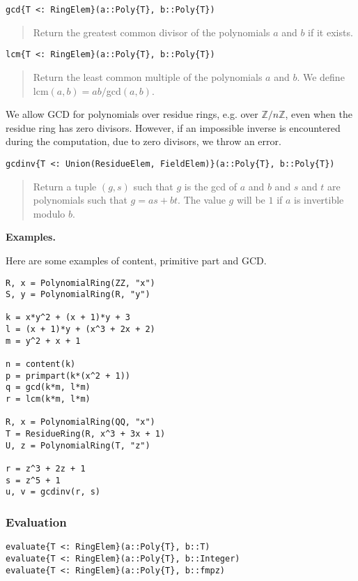 \documentclass[a4paper,10pt]{article}
\newcommand{\Z}{\mathbb{Z}}
\newcommand{\desc}[1]{\vspace{-3mm}\begin{quote}#1\end{quote}}
\begin{document}
\begin{lstlisting}
gcd{T <: RingElem}(a::Poly{T}, b::Poly{T})
\end{lstlisting}

\desc{Return the greatest common divisor of the polynomials $a$ and $b$ if 
it exists.}

\begin{lstlisting}
lcm{T <: RingElem}(a::Poly{T}, b::Poly{T})
\end{lstlisting}

\desc{Return the least common multiple of the polynomials $a$ and $b$. We
define lcm$(a, b) = ab/$gcd$(a, b)$.}

We allow GCD for polynomials over residue rings, e.g. over $\Z/n\Z$, even when
the residue ring has zero divisors. However, if an impossible inverse is
encountered during the computation, due to zero divisors, we throw an error.

\begin{lstlisting}
gcdinv{T <: Union(ResidueElem, FieldElem)}(a::Poly{T}, b::Poly{T})
\end{lstlisting}

\desc{Return a tuple $(g, s)$ such that $g$ is the gcd of $a$ and $b$ and $s$
and $t$ are polynomials such that $g = as + bt$. The value $g$ will be $1$ if
$a$ is invertible modulo $b$.}

\textbf{Examples.}

Here are some examples of content, primitive part and GCD.

\begin{lstlisting}
R, x = PolynomialRing(ZZ, "x")
S, y = PolynomialRing(R, "y")

k = x*y^2 + (x + 1)*y + 3
l = (x + 1)*y + (x^3 + 2x + 2)
m = y^2 + x + 1

n = content(k)
p = primpart(k*(x^2 + 1))
q = gcd(k*m, l*m)
r = lcm(k*m, l*m)

R, x = PolynomialRing(QQ, "x")
T = ResidueRing(R, x^3 + 3x + 1)
U, z = PolynomialRing(T, "z")

r = z^3 + 2z + 1
s = z^5 + 1
u, v = gcdinv(r, s)
\end{lstlisting}

\subsubsection{Evaluation}

\begin{lstlisting}
evaluate{T <: RingElem}(a::Poly{T}, b::T)
evaluate{T <: RingElem}(a::Poly{T}, b::Integer)
evaluate{T <: RingElem}(a::Poly{T}, b::fmpz)
\end{lstlisting}
\end{document}
